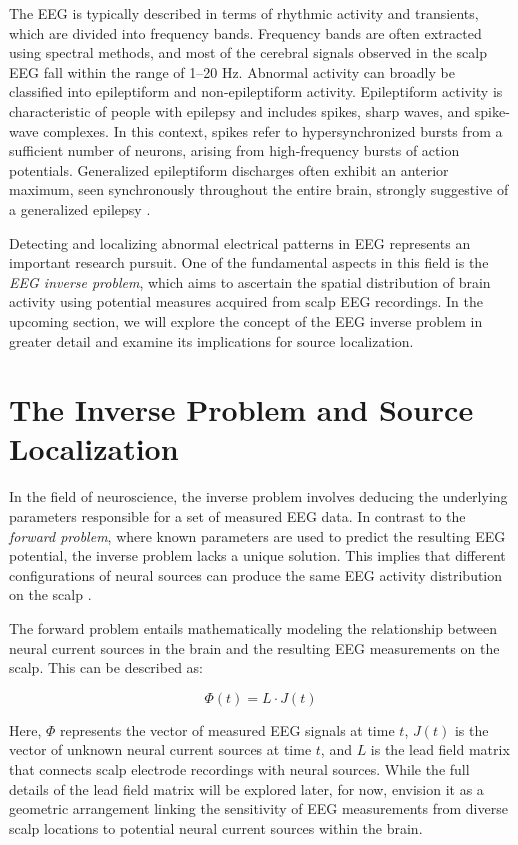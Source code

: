 \documentclass[a4paper, UKenglish, 11pt]{uiomaster}
\begin{document}
The EEG is typically described in terms of rhythmic activity and transients, which are divided into frequency bands. Frequency bands are often extracted using spectral methods, and most of the cerebral signals observed in the scalp EEG fall within the range of 1–20 Hz. Abnormal activity can broadly be classified into epileptiform and non-epileptiform activity. Epileptiform activity is characteristic of people with epilepsy and includes spikes, sharp waves, and spike-wave complexes. In this context, spikes refer to hypersynchronized bursts from a sufficient number of neurons, arising from high-frequency bursts of action potentials. Generalized epileptiform discharges often exhibit an anterior maximum, seen synchronously throughout the entire brain, strongly suggestive of a generalized epilepsy \cite{bromfield2006introduction}.

Detecting and localizing abnormal electrical patterns in EEG represents an important research pursuit. One of the fundamental aspects in this field is the \emph{EEG inverse problem}, which aims to ascertain the spatial distribution of brain activity using potential measures acquired from scalp EEG recordings. In the upcoming section, we will explore the concept of the EEG inverse problem in greater detail and examine its implications for source localization.

\section{The Inverse Problem and Source Localization}
In the field of neuroscience, the inverse problem involves deducing the underlying parameters responsible for a set of measured EEG data. In contrast to the \emph{forward problem}, where known parameters are used to predict the resulting EEG potential, the inverse problem lacks a unique solution. This implies that different configurations of neural sources can produce the same EEG activity distribution on the scalp \cite{hecker2021convdip}.

The forward problem entails mathematically modeling the relationship between neural current sources in the brain and the resulting EEG measurements on the scalp. This can be described as:

\begin{equation}
\Phi(t) = L \cdot J(t)
\label{eq:forward_problem}
\end{equation}

Here, $\Phi$ represents the vector of measured EEG signals at time $t$, $J(t)$ is the vector of unknown neural current sources at time $t$, and $L$ is the lead field matrix that connects scalp electrode recordings with neural sources. While the full details of the lead field matrix will be explored later, for now, envision it as a geometric arrangement linking the sensitivity of EEG measurements from diverse scalp locations to potential neural current sources within the brain.
\end{document}
